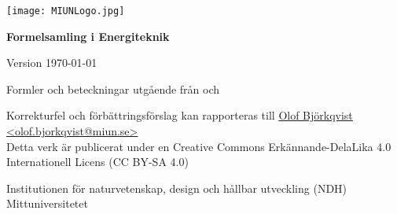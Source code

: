 \begin{titlepage}
    \begin{center}
        \texttt{[image: MIUNLogo.jpg]}
        \vspace*{4cm}
            
        \Huge
        \textbf{Formelsamling i Energiteknik} \par
            
        \Large
        \renewcommand{\dateseparator}{-}
        Version \today
            
        \vspace{2,5cm}
            
            
        
        \vfill
            
		\normalsize
		Formler och beteckningar utgående från \cite{soleimani_mohseni_formelsamling_2018} och \cite{alvarez_energiteknik_2006} \par
		\tiny
		Korrekturfel och förbättringsförslag kan rapporteras till \href{mailto:olof.bjorkqvist@miun.se}{Olof Björkqvist <olof.bjorkqvist@miun.se>} \\
		Detta verk är publicerat under en Creative Commons Erkännande-DelaLika 4.0 Internationell Licens  (CC BY-SA 4.0)

            
        \Large
        Institutionen för naturvetenskap, design och hållbar utveckling (NDH)\\
        Mittuniversitetet\\
            
    \end{center}
\end{titlepage}
